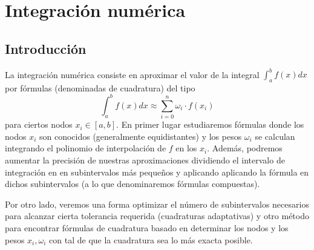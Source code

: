  \chapter{Integraci{\'o}n num{\'e}rica}
 \section{Introducción}
 La integración numérica consiste en aproximar el valor de la integral $\int_a^bf(x)dx$ por fórmulas (denominadas de cuadratura) del tipo
 $$\int_a^bf(x)dx\approx\sum_{i=0}^n\omega_i\cdot f(x_i) $$
 para ciertos nodos $x_i\in[a,b]$. En primer lugar estudiaremos fórmulas donde los nodos $x_i$ son conocidos (generalmente equidistantes) y los pesos $\omega_i$ se calculan integrando el polinomio de interpolación de $f$ en los $x_i$. Además, podremos aumentar la precisión de nuestras aproximaciones  dividiendo el intervalo de integración en en subintervalos más pequeños y aplicando aplicando la fórmula en dichos subintervalos (a lo que denominaremos fórmulas compuestas).

Por otro lado, veremos una forma optimizar el número de subintervalos necesarios para alcanzar cierta tolerancia requerida (cuadraturas adaptativas) y otro método para encontrar fórmulas de cuadratura basado en determinar los nodos y los pesos $x_i,\omega_i$ con tal de que la cuadratura sea lo más exacta posible.
